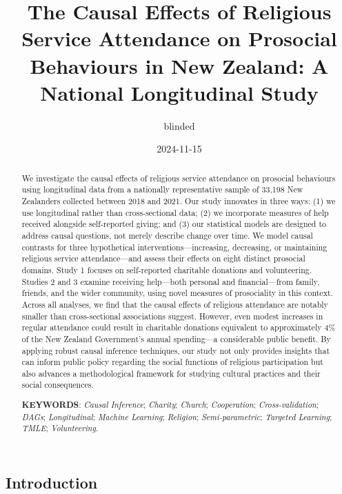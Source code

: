 \documentclass[
  single column]{article}
\title{The Causal Effects of Religious Service Attendance on Prosocial
Behaviours in New Zealand: A National Longitudinal Study}
\author{blinded}
\date{2024-11-15}
\begin{document}
\maketitle
\begin{abstract}
We investigate the causal effects of religious service attendance on
prosocial behaviours using longitudinal data from a nationally
representative sample of 33,198 New Zealanders collected between 2018
and 2021. Our study innovates in three ways: (1) we use longitudinal
rather than cross-sectional data; (2) we incorporate measures of help
received alongside self-reported giving; and (3) our statistical models
are designed to address causal questions, not merely describe change
over time. We model causal contrasts for three hypothetical
interventions---increasing, decreasing, or maintaining religious service
attendance---and assess their effects on eight distinct prosocial
domains. Study 1 focuses on self-reported charitable donations and
volunteering. Studies 2 and 3 examine receiving help---both personal and
financial---from family, friends, and the wider community, using novel
measures of prosociality in this context. Across all analyses, we find
that the causal effects of religious attendance are notably smaller than
cross-sectional associations suggest. However, even modest increases in
regular attendance could result in charitable donations equivalent to
approximately 4\% of the New Zealand Government's annual spending---a
considerable public benefit. By applying robust causal inference
techniques, our study not only provides insights that can inform public
policy regarding the social functions of religious participation but
also advances a methodological framework for studying cultural practices
and their social consequences.

\textbf{KEYWORDS}: \emph{Causal Inference}; \emph{Charity};
\emph{Church}; \emph{Cooperation}; \emph{Cross-validation}; \emph{DAGs};
\emph{Longitudinal}; \emph{Machine Learning}; \emph{Religion};
\emph{Semi-parametric}; \emph{Targeted Learning}; \emph{TMLE};
\emph{Volunteering}.
\end{abstract}


\subsection{Introduction}\label{introduction}
\end{document}
